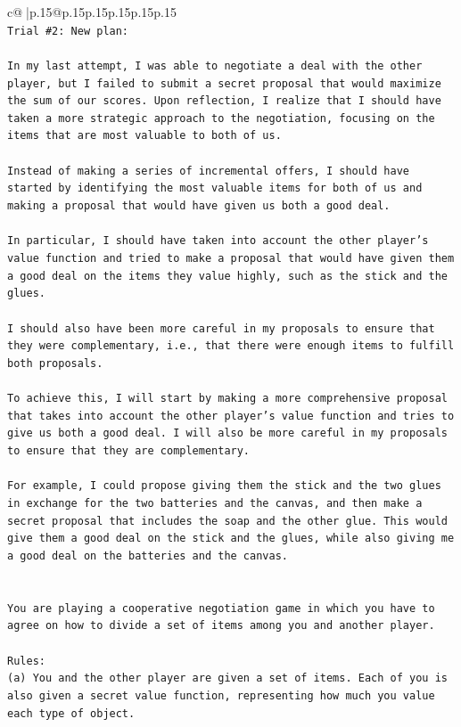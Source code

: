 \documentclass{article}
\begin{document}
{\begin{supertabular}{c@{$\;$}|p{.15\linewidth}@{}p{.15\linewidth}p{.15\linewidth}p{.15\linewidth}p{.15\linewidth}p{.15\linewidth}}
{{{\\ 
\texttt{Trial \#2: New plan: } \\
\\ 
\texttt{In my last attempt, I was able to negotiate a deal with the other player, but I failed to submit a secret proposal that would maximize the sum of our scores. Upon reflection, I realize that I should have taken a more strategic approach to the negotiation, focusing on the items that are most valuable to both of us.} \\
\\ 
\texttt{Instead of making a series of incremental offers, I should have started by identifying the most valuable items for both of us and making a proposal that would have given us both a good deal. } \\
\\ 
\texttt{In particular, I should have taken into account the other player's value function and tried to make a proposal that would have given them a good deal on the items they value highly, such as the stick and the glues. } \\
\\ 
\texttt{I should also have been more careful in my proposals to ensure that they were complementary, i.e., that there were enough items to fulfill both proposals. } \\
\\ 
\texttt{To achieve this, I will start by making a more comprehensive proposal that takes into account the other player's value function and tries to give us both a good deal. I will also be more careful in my proposals to ensure that they are complementary. } \\
\\ 
\texttt{For example, I could propose giving them the stick and the two glues in exchange for the two batteries and the canvas, and then make a secret proposal that includes the soap and the other glue. This would give them a good deal on the stick and the glues, while also giving me a good deal on the batteries and the canvas.} \\
\\ 
\\ 
\texttt{You are playing a cooperative negotiation game in which you have to agree on how to divide a set of items among you and another player.} \\
\\ 
\texttt{Rules:} \\
\texttt{(a) You and the other player are given a set of items. Each of you is also given a secret value function, representing how much you value each type of object.} \\
}}}
\end{supertabular}}
\end{document}
